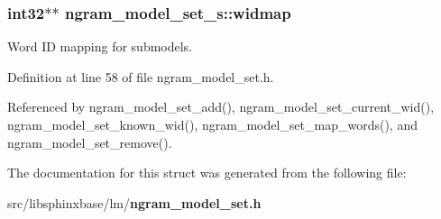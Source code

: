 \subsubsection[{widmap}]{\setlength{\rightskip}{0pt plus 5cm}int32$\ast$$\ast$ ngram\-\_\-model\-\_\-set\-\_\-s\-::widmap}\label{structngram__model__set__s_addebde44e2b7aa22dd82032c316fc962}


Word I\-D mapping for submodels. 



Definition at line 58 of file ngram\-\_\-model\-\_\-set.\-h.



Referenced by ngram\-\_\-model\-\_\-set\-\_\-add(), ngram\-\_\-model\-\_\-set\-\_\-current\-\_\-wid(), ngram\-\_\-model\-\_\-set\-\_\-known\-\_\-wid(), ngram\-\_\-model\-\_\-set\-\_\-map\-\_\-words(), and ngram\-\_\-model\-\_\-set\-\_\-remove().



The documentation for this struct was generated from the following file\-:\begin{DoxyCompactItemize}
\item 
src/libsphinxbase/lm/{\bf ngram\-\_\-model\-\_\-set.\-h}\end{DoxyCompactItemize}
